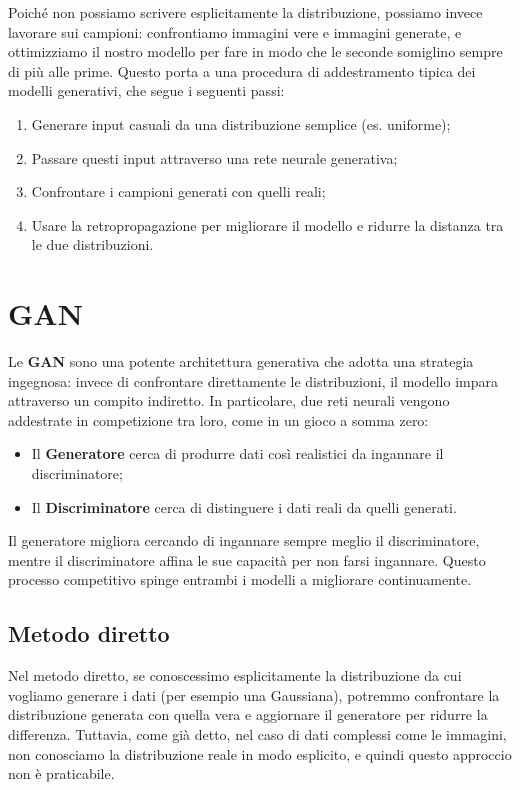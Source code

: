Poiché non possiamo scrivere esplicitamente la distribuzione, possiamo invece lavorare sui campioni: confrontiamo immagini vere e immagini generate, e ottimizziamo il nostro modello per fare in modo che le seconde somiglino sempre di più alle prime. Questo porta a una procedura di addestramento tipica dei modelli generativi, che segue i seguenti passi:

\begin{enumerate}
\item Generare input casuali da una distribuzione semplice (es. uniforme);
\item Passare questi input attraverso una rete neurale generativa;
\item Confrontare i campioni generati con quelli reali;
\item Usare la retropropagazione per migliorare il modello e ridurre la distanza tra le due distribuzioni.
\end{enumerate}

\section{GAN}

Le \textbf{GAN} sono una potente architettura generativa che adotta una strategia ingegnosa: invece di confrontare direttamente le distribuzioni, il modello impara attraverso un compito indiretto. In particolare, due reti neurali vengono addestrate in competizione tra loro, come in un gioco a somma zero:

\begin{itemize}
    \item Il \textbf{Generatore} cerca di produrre dati così realistici da ingannare il discriminatore;
    \item Il \textbf{Discriminatore} cerca di distinguere i dati reali da quelli generati.
\end{itemize}

Il generatore migliora cercando di ingannare sempre meglio il discriminatore, mentre il discriminatore affina le sue capacità per non farsi ingannare. Questo processo competitivo spinge entrambi i modelli a migliorare continuamente.

\subsection{Metodo diretto}

Nel metodo diretto, se conoscessimo esplicitamente la distribuzione da cui vogliamo generare i dati (per esempio una Gaussiana), potremmo confrontare la distribuzione generata con quella vera e aggiornare il generatore per ridurre la differenza. Tuttavia, come già detto, nel caso di dati complessi come le immagini, non conosciamo la distribuzione reale in modo esplicito, e quindi questo approccio non è praticabile.

